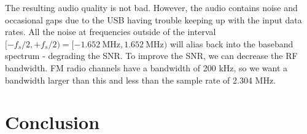 \documentclass{article}
\begin{document}
The resulting audio quality is not bad. However, the audio contains noise and occasional gaps due to the USB having trouble keeping up with the input data rates. All the noise at frequencies outside of the interval $[-f_s/2, +f_s/2) = [-1.652\ \text{MHz}, 1.652\ \text{MHz})$ will alias back into the baseband spectrum - degrading the SNR. To improve the SNR, we can decrease the RF bandwidth. FM radio channels have a bandwidth of 200 kHz, so we want a bandwidth larger than this and less than the sample rate of 2.304 MHz. 

\section{Conclusion}

%
%
	
\end{document}
